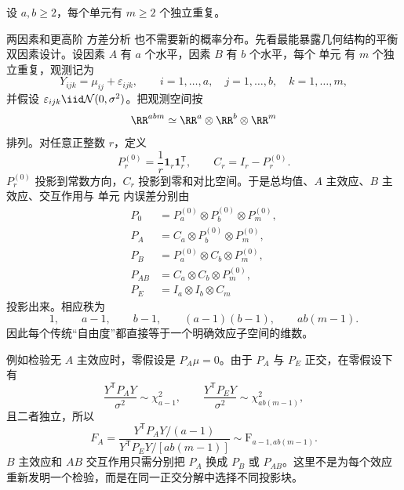 \begin{theorem}
设 $a,b\ge2$，每个单元有 $m\ge2$ 个独立重复。


两因素和更高阶 方差分析 也不需要新的概率分布。先看最能暴露几何结构的平衡双因素设计。设因素 $A$ 有 $a$ 个水平，因素 $B$ 有 $b$ 个水平，每个 单元 有 $m$ 个独立重复，观测记为
\[
 Y_{ijk}=\mu_{ij}+\varepsilon_{ijk},
 \qquad
 i=1,\ldots,a,
 \quad
 j=1,\ldots,b,
 \quad
 k=1,\ldots,m,
\]
并假设 $\varepsilon_{ijk}\iid\mathcal N(0,\sigma^2)$。把观测空间按
\[
 \RR^{abm}
 \simeq
 \RR^a\otimes\RR^b\otimes\RR^m
\]
排列。对任意正整数 $r$，定义
\[
 P_r^{(0)}=\frac1r\mathbf1_r\mathbf1_r^{\mathsf T},
 \qquad
 C_r=I_r-P_r^{(0)}.
\]
$P_r^{(0)}$ 投影到常数方向，$C_r$ 投影到零和对比空间。于是总均值、$A$ 主效应、$B$ 主效应、交互作用与 单元 内误差分别由
\begin{align*}
 P_0&=P_a^{(0)}\otimes P_b^{(0)}\otimes P_m^{(0)},\\
 P_A&=C_a\otimes P_b^{(0)}\otimes P_m^{(0)},\\
 P_B&=P_a^{(0)}\otimes C_b\otimes P_m^{(0)},\\
 P_{AB}&=C_a\otimes C_b\otimes P_m^{(0)},\\
 P_E&=I_a\otimes I_b\otimes C_m
\end{align*}
投影出来。相应秩为
\[
 1,
 \qquad
 a-1,
 \qquad
 b-1,
 \qquad
 (a-1)(b-1),
 \qquad
 ab(m-1).
\]
因此每个传统“自由度”都直接等于一个明确效应子空间的维数。

例如检验无 $A$ 主效应时，零假设是 $P_A\mu=0$。由于 $P_A$ 与 $P_E$ 正交，在零假设下有
\[
 \frac{Y^{\mathsf T}P_AY}{\sigma^2}\sim\chi^2_{a-1},
 \qquad
 \frac{Y^{\mathsf T}P_EY}{\sigma^2}\sim\chi^2_{ab(m-1)},
\]
且二者独立，所以
\begin{equation}\label{eq:math-stat-balanced-two-way-anova-f}
 F_A
 =\frac{Y^{\mathsf T}P_AY/(a-1)}
 {Y^{\mathsf T}P_EY/[ab(m-1)]}
 \sim\mathrm F_{a-1,ab(m-1)}.
\end{equation}
$B$ 主效应和 $AB$ 交互作用只需分别把 $P_A$ 换成 $P_B$ 或 $P_{AB}$。这里不是为每个效应重新发明一个检验，而是在同一正交分解中选择不同投影块。
\end{theorem}

